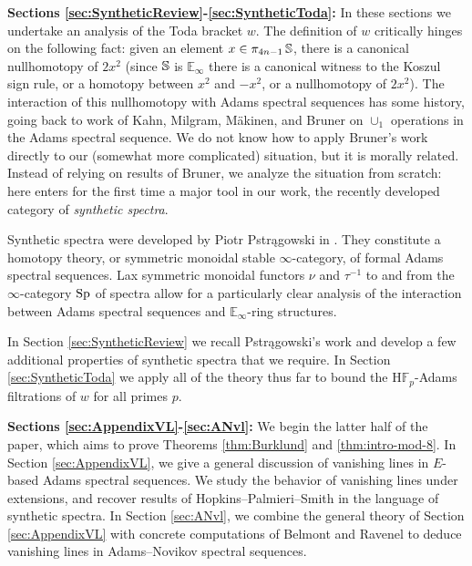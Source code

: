 \vspace{1ex}
\noindent \textbf{Sections \ref{sec:SyntheticReview}-\ref{sec:SyntheticToda}:} In these sections we undertake an analysis of the Toda bracket $w$.
The definition of $w$ critically hinges on the following fact: given an element $x \in \pi_{4n-1} \operatorname{\mathbb{S}}$, there is a canonical nullhomotopy of $2x^2$ (since $\operatorname{\mathbb{S}}$ is $\mathbb{E}_\infty$ there is a canonical witness to the Koszul sign rule, or a homotopy between $x^2$ and $-x^2$, or a nullhomotopy of $2x^2$).
The interaction of this nullhomotopy with Adams spectral sequences has some history, going back to work of Kahn, Milgram, M\"{a}kinen, and Bruner \cite[VI]{BMMS} on $\cup_1$ operations in the Adams spectral sequence.
We do not know how to apply Bruner's work directly to our (somewhat more complicated) situation, but it is morally related.
Instead of relying on results of Bruner, we analyze the situation from scratch: here enters for the first time a major tool in our work, the recently developed category of \emph{synthetic spectra}.

Synthetic spectra were developed by Piotr Pstr\k{a}gowski in \cite{Pstragowski}.
They constitute a homotopy theory, or symmetric monoidal stable $\infty$-category, of formal Adams spectral sequences.
Lax symmetric monoidal functors $\nu$ and $\tau^{-1}$ to and from the $\infty$-category $\operatorname{\mathrm{Sp}}$ of spectra allow for a particularly clear analysis of the interaction between Adams spectral sequences and $\mathbb{E}_\infty$-ring structures.

In Section \ref{sec:SyntheticReview} we recall Pstr\k{a}gowski's work and develop a few additional properties of synthetic spectra that we require.  In Section \ref{sec:SyntheticToda} we apply all of the theory thus far to bound the $\mathrm{H}\mathbb{F}_p$-Adams filtrations of $w$ for all primes $p$. 

\vspace{1ex}
\noindent \textbf{Sections \ref{sec:AppendixVL}-\ref{sec:ANvl}:} We begin the latter half of the paper, which aims to prove Theorems \ref{thm:Burklund} and \ref{thm:intro-mod-8}.
In Section \ref{sec:AppendixVL}, we give a general discussion of vanishing lines in $E$-based Adams spectral sequences.  We study the behavior of vanishing lines under extensions, and recover results of Hopkins--Palmieri--Smith \cite{HPS} in the language of synthetic spectra.
In Section \ref{sec:ANvl}, we combine the general theory of Section \ref{sec:AppendixVL} with concrete computations of Belmont \cite{Eva} and  Ravenel \cite{GreenBook} to deduce vanishing lines in Adams--Novikov spectral sequences.

